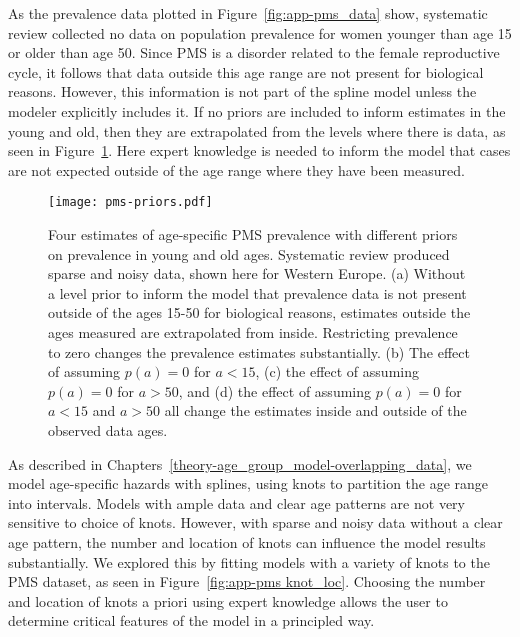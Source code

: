 As the prevalence data plotted in Figure~\ref{fig:app-pms_data} show,
systematic review collected no data on population prevalence for women
younger than age 15 or older than age 50.  Since PMS is a disorder
related to the female reproductive cycle, it follows that data outside
this age range are not present for biological reasons.  However, this
information is not part of the spline model unless the modeler
explicitly includes it.  If no priors are included to inform estimates
in the young and old, then they are extrapolated from the levels where
there is data, as seen in Figure~\ref{fig:app-pms prios_on_level}.
Here expert knowledge is needed to inform the model that cases are not
expected outside of the age range where they have been measured.

    \begin{figure}
        \begin{center}
            \texttt{[image: pms-priors.pdf]}
        \end{center}
        \caption[Four estimates of age-specific PMS prevalence with
          different priors on prevalence in young and old ages]{Four
          estimates of age-specific PMS prevalence with different
          priors on prevalence in young and old ages.  Systematic
          review produced sparse and noisy data, shown here for
          Western Europe.  (a) Without a level prior to inform the
          model that prevalence data is not present outside of the
          ages 15-50 for biological reasons, estimates outside the
          ages measured are extrapolated from inside.  Restricting
          prevalence to zero changes the prevalence estimates
          substantially. (b) The effect of assuming $p(a) = 0$ for
          $a<15$, (c) the effect of assuming $p(a) = 0$ for $a>50$,
          and (d) the effect of assuming $p(a) = 0$ for $a<15$ and
          $a>50$ all change the estimates inside and outside of the
          observed data ages.}
        \label{fig:app-pms prios_on_level}
    \end{figure}


As described in
Chapters~\ref{theory-age_group_model-overlapping_data}, we model
age-specific hazards with splines, using knots to partition the age
range into intervals.  Models with ample data and clear age patterns
are not very sensitive to choice of knots.  However, with sparse and
noisy data without a clear age pattern, the number and location of
knots can influence the model results substantially.  We explored this
by fitting models with a variety of knots to the PMS dataset, as seen
in Figure~\ref{fig:app-pms knot_loc}.  Choosing the number and
location of knots a priori using expert knowledge allows the user to
determine critical features of the model in a principled way.

